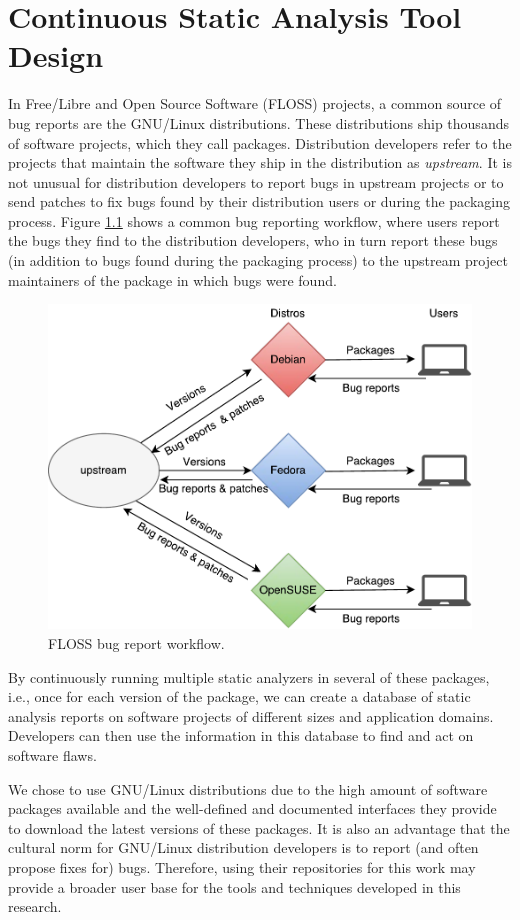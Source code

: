 \chapter{Continuous Static Analysis Tool Design}
\label{ch:kiskadee}

In Free/Libre and Open Source Software (FLOSS) projects, a
common source of bug reports are the GNU/Linux distributions.
These distributions ship thousands of software projects, which
they call packages. Distribution developers refer to the
projects that maintain the software they ship in the
distribution as \textit{upstream}.  It is not unusual for
distribution developers to report bugs in upstream projects or
to send patches to fix bugs found by their distribution users
or during the packaging process. Figure
\ref{fig:floss_bugs_workflow} shows a common bug reporting
workflow, where users report the bugs they find to the
distribution developers, who in turn report these bugs (in
addition to bugs found during the packaging process) to the
upstream project maintainers of the package in which bugs were
found.

\begin{figure}[!h]
  \centering
  \includegraphics[width=.75\textwidth]{figures/floss_bugs_workflow} 
  \caption{FLOSS bug report workflow.}
  \label{fig:floss_bugs_workflow} 
\end{figure}

By continuously running multiple static analyzers in several of these packages,
i.e., once for each version of the package, we can create a database of static
analysis reports on software projects of different sizes and application
domains. Developers can then use the information in this database to find and
act on software flaws.

We chose to use GNU/Linux distributions due to the high amount
of software packages available and the well-defined and
documented interfaces they provide to download the latest
versions of these packages. It is also an advantage that the
cultural norm for GNU/Linux distribution developers is to
report (and often propose fixes for) bugs. Therefore, using
their repositories for this work may provide a broader user
base for the tools and techniques developed in this research.

